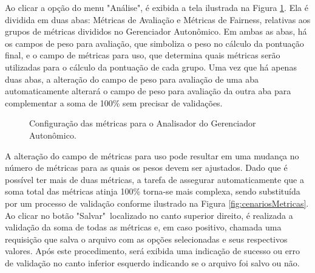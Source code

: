 \documentclass[Portugues,Final]{ic-tese-v3}
\begin{document}
Ao clicar a opção do menu "Análise", é exibida a tela ilustrada na Figura \ref{fig:configMetricas}. Ela é dividida em duas abas: Métricas de Avaliação e Métricas de Fairness, relativas aos grupos de métricas divididos no Gerenciador Autonômico. Em ambas as abas, há os campos de peso para avaliação, que simboliza o peso no cálculo da pontuação final, e o campo de métricas para uso, que determina quais métricas serão utilizadas para o cálculo da pontuação de cada grupo. Uma vez que há apenas duas abas, a alteração do campo de peso para avaliação de uma aba automaticamente alterará o campo de peso para avaliação da outra aba para complementar a soma de 100\% sem precisar de validações.

\begin{figure}[H]
    \centering
    \caption{Configuração das métricas para o Analisador do Gerenciador Autonômico.}
    \label{fig:configMetricas}
\end{figure}

A alteração do campo de métricas para uso pode resultar em uma mudança no número de métricas para as quais os pesos devem ser ajustados. Dado que é possível ter mais de duas métricas, a tarefa de assegurar automaticamente que a soma total das métricas atinja 100\% torna-se mais complexa, sendo substituída por um processo de validação conforme ilustrado na Figura \ref{fig:cenariosMetricas}. Ao clicar no botão "Salvar"~localizado no canto superior direito, é realizada a validação da soma de todas as métricas e, em caso positivo, chamada uma requisição que salva o arquivo com as opções selecionadas e seus respectivos valores. Após este procedimento, será exibida uma indicação de sucesso ou erro de validação no canto inferior esquerdo indicando se o arquivo foi salvo ou não.
\end{document}

